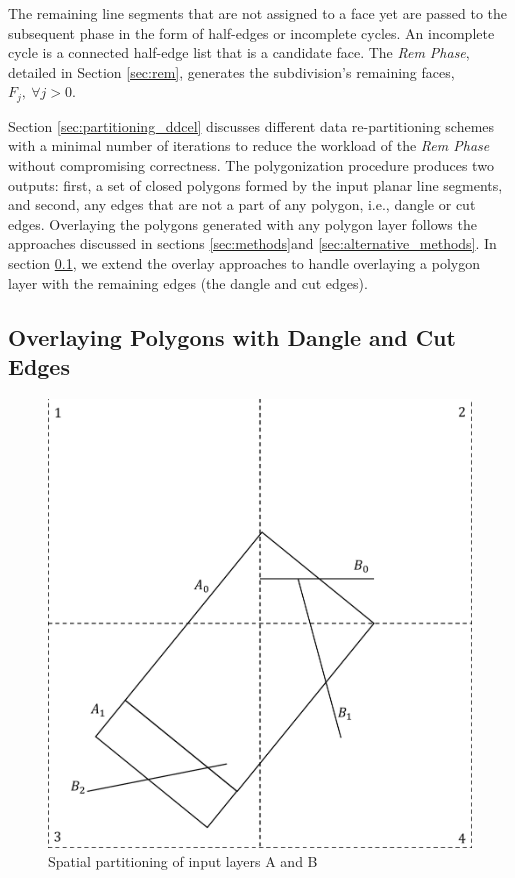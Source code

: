 The remaining line segments that are not assigned to a face yet are passed to the subsequent phase in the form of half-edges or incomplete cycles. An incomplete 
cycle is a connected half-edge list that is a candidate face. The \textit{Rem Phase}, detailed in Section \ref{sec:rem}, generates the subdivision's remaining 
faces, $F_j, \ \forall j > 0$. 

Section \ref{sec:partitioning_ddcel} discusses different data re-partitioning schemes with a minimal number of iterations to reduce the workload of the 
\textit{Rem Phase} without compromising correctness. The polygonization procedure produces two outputs: first, a set of closed polygons formed by the input 
planar line segments, and second, any edges that are not a part of any polygon, i.e., dangle or cut edges. Overlaying the polygons generated with any polygon 
layer follows the approaches discussed in sections \ref{sec:methods}and \ref{sec:alternative_methods}. In section \ref{sec:over_dang}, we extend the overlay 
approaches to handle overlaying a polygon layer with the remaining edges (the dangle and cut edges).





\subsection{Overlaying Polygons with Dangle and Cut Edges} \label{sec:over_dang}

\begin{figure}[tb]
	\centering
	\includegraphics[width=0.75 \linewidth ]{chapter2/model/DangleOverlay1.pdf}
	\caption{Spatial partitioning of input layers A and B}
	\label{fig:dangleoverlay:input}
\end{figure}

